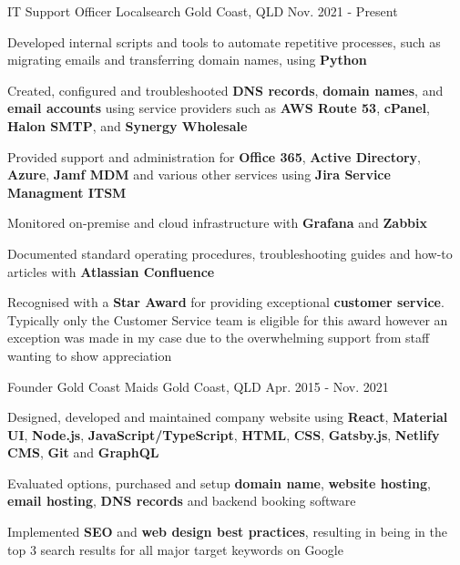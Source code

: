 \begin{cventries}
  \cventry
    {IT Support Officer}
    {Localsearch}
    {Gold Coast, QLD}
    {Nov. 2021 - Present}
    {
      \begin{cvitems}
        \item {Developed internal scripts and tools to automate repetitive processes, such as migrating emails and transferring domain names, using \textbf{Python}}
        \item {Created, configured and troubleshooted \textbf{DNS records}, \textbf{domain names}, and \textbf{email accounts} using service providers such as \textbf{AWS Route 53}, \textbf{cPanel}, \textbf{Halon SMTP}, and \textbf{Synergy Wholesale}}
        \item {Provided support and administration for \textbf{Office 365}, \textbf{Active Directory}, \textbf{Azure}, \textbf{Jamf MDM} and various other services using \textbf{Jira Service Managment ITSM}}
        \item {Monitored on-premise and cloud infrastructure with \textbf{Grafana} and \textbf{Zabbix}}
        \item {Documented standard operating procedures, troubleshooting guides and how-to articles with \textbf{Atlassian Confluence}}
        \item {Recognised with a \textbf{Star Award} for providing exceptional \textbf{customer service}. Typically only the Customer Service team is eligible for this award however an exception was made in my case due to the overwhelming support from staff wanting to show appreciation}
      \end{cvitems}
    }
  \cventry
    {Founder}
    {Gold Coast Maids}
    {Gold Coast, QLD}
    {Apr. 2015 - Nov. 2021}
    {
      \begin{cvitems}
        \item {Designed, developed and maintained company website using \textbf{React}, \textbf{Material UI}, \textbf{Node.js}, \textbf{JavaScript/TypeScript}, \textbf{HTML}, \textbf{CSS}, \textbf{Gatsby.js}, \textbf{Netlify CMS}, \textbf{Git} and \textbf{GraphQL}}
        \item {Evaluated options, purchased and setup \textbf{domain name}, \textbf{website hosting}, \textbf{email hosting}, \textbf{DNS records} and backend booking software}
        \item {Implemented \textbf{SEO} and \textbf{web design best practices}, resulting in being in the top 3 search results for all major target keywords on Google}

\end{cvitems}}
\end{cventries}

